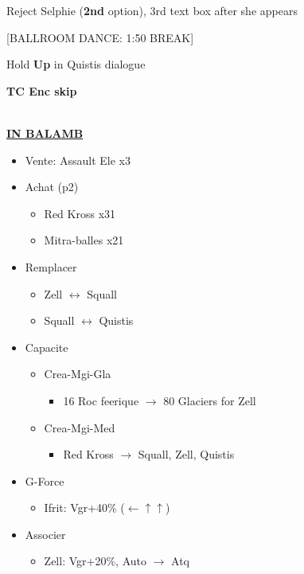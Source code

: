 Reject Selphie (\textbf{2nd} option), 3rd text box after she appears

[BALLROOM DANCE: 1:50 BREAK]

Hold \textbf{Up} in Quistis dialogue

\textbf{TC Enc skip}

\leavevmode\\
\underline{\textbf{IN BALAMB}}

\begin{shop}
	\begin{itemize}
		\item Vente: Assault Ele x3
		\item Achat (p2)
			\begin{itemize}
				\item Red Kross x31
				\item Mitra-balles x21
			\end{itemize}
	\end{itemize}
\end{shop}

\begin{menu}
	\begin{itemize}
		\item Remplacer
			\begin{itemize}
				\item Zell $\leftrightarrow$ Squall
				\item Squall $\leftrightarrow$ Quistis
			\end{itemize}
		\item Capacite
			\begin{itemize}
				\item Crea-Mgi-Gla
					\begin{itemize}
						\item 16 Roc feerique $\rightarrow$ 80 Glaciers for Zell
					\end{itemize}					 
				\item Crea-Mgi-Med
					\begin{itemize}
						\item Red Kross $\rightarrow$ Squall, Zell, Quistis
					\end{itemize}	
			\end{itemize}
		\item G-Force
			\begin{itemize}
				\item Ifrit: Vgr+40\% ($\leftarrow\uparrow\uparrow$)
			\end{itemize}
		\item Associer
			\begin{itemize}
				\item Zell: Vgr+20\%, Auto $\rightarrow$ Atq
			\end{itemize}
	\end{itemize}
\end{menu}

